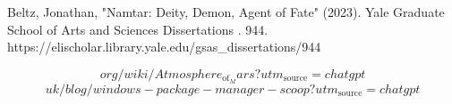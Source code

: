 
\begin{tzpsnapshot}
\end{tzpsnapshot}

Beltz, Jonathan, "Namtar: Deity, Demon, Agent of Fate" (2023). Yale Graduate School of Arts and Sciences Dissertations . 944. https://elischolar.library.yale.edu/gsas\_dissertations/944

\[
org/wiki/Atmosphere_{\mathrm{of}}_Mars?utm_{\mathrm{source}}=chatgpt
\]
\[
uk/blog/windows-package-manager-scoop?utm_{\mathrm{source}}=chatgpt
\]

